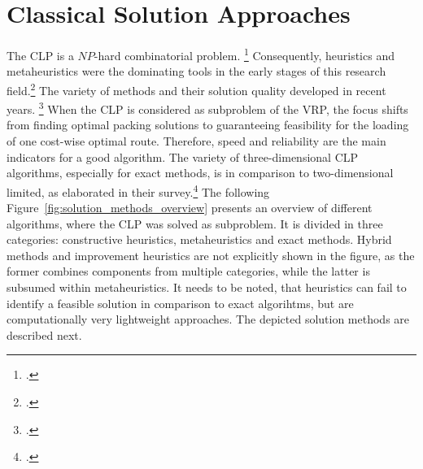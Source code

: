 \section{Classical Solution Approaches}
\label{sec:classical_solution_approaches}
The \gls{CLP} is a $NP$-hard combinatorial problem. \footcite[cf.][p. 11]{bortfeldt_constraints_2013}
Consequently, heuristics and metaheuristics were the dominating tools
in the early stages of this research field.\footcite[cf.][]{pisinger_heuristics_2002} The variety of methods
and their solution quality developed in recent years. \footcite[cf.][p. 23]{iori_exact_2021}
When the \gls{CLP} is considered as subproblem of the \gls{VRP}, the focus shifts from finding optimal
packing solutions to guaranteeing feasibility for the loading of one cost-wise optimal route. Therefore,
speed and reliability are the main indicators for a good algorithm.
The variety of three-dimensional \gls{CLP} algorithms, especially for exact methods, is in comparison to two-dimensional limited, as
\textcite{zhao_comparative_2016} elaborated in their survey.\footcite[cf.][]{zhao_comparative_2016}
The following Figure~\ref{fig:solution_methods_overview} presents an overview of different algorithms,
where the \gls{CLP} was solved as subproblem.
It is divided in three categories: constructive heuristics, metaheuristics
and exact methods. Hybrid methods and improvement heuristics are not explicitly shown in the figure,
as the former combines components from multiple categories, while the latter is subsumed within
metaheuristics. It needs to be noted, that heuristics can fail to identify a feasible solution
in comparison to exact algorihtms, but are computationally very lightweight approaches.
The depicted solution methods are described next.



